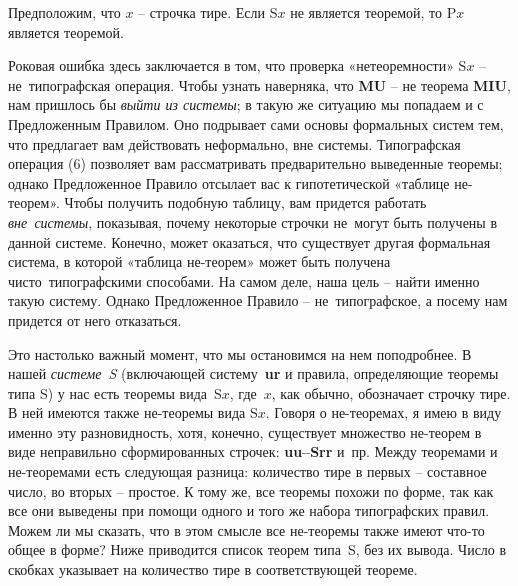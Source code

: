 \documentclass[../main.tex]{subfiles}
\begin{document}
\begin{tcolorbox}[title={ПРЕДЛОЖЕННОЕ ПРАВИЛО}]
    Предположим, что $x$ \--- строчка тире.
    Если S$x$ не является теоремой, то P$x$ является теоремой.
\end{tcolorbox}

Роковая ошибка здесь заключается в том, что проверка «нетеоремности» S$x$ \--- не~типографская операция.
Чтобы узнать наверняка, что \textbf{MU} \--- не теорема \textbf{MIU}, нам пришлось бы \emph{выйти из системы}; в такую же ситуацию мы попадаем и с Предложенным Правилом.
Оно подрывает сами основы формальных систем тем, что предлагает вам действовать неформально, вне системы.
Типографская операция (6) позволяет вам рассматривать предварительно выведенные теоремы; однако Предложенное Правило отсылает вас к гипотетической «таблице не-теорем».
Чтобы получить подобную таблицу, вам придется работать \emph{вне~системы}, показывая, почему некоторые строчки не~могут быть получены в данной системе.
Конечно, может оказаться, что существует другая формальная система, в которой «таблица не-теорем» может быть получена чисто~типографскими способами.
На самом деле, наша цель \--- найти именно такую систему.
Однако Предложенное Правило \--- не~типографское, а посему нам придется от него отказаться.

Это настолько важный момент, что мы остановимся на нем поподробнее.
В нашей \emph{системе~S} (включающей систему~\textbf{ur} и правила, определяющие теоремы типа S) у нас есть теоремы вида~S$x$, где~$x$, как обычно, обозначает строчку тире.
В ней имеются также не-теоремы вида S$x$.
Говоря о не-теоремах, я имею в виду именно эту разновидность, хотя, конечно, существует множество не-теорем в виде неправильно сформированных строчек: \textbf{uu--Srr} и~пр.
Между теоремами и не-теоремами есть следующая разница: количество тире в первых \--- составное число, во вторых \--- простое.
К тому же, все теоремы похожи по форме, так как все они выведены при помощи одного и того же набора типографских правил.
Можем ли мы сказать, что в этом смысле все не-теоремы также имеют что-то общее в форме?
Ниже приводится список теорем типа~S, без их вывода.
Число в скобках указывает на количество тире в соответствующей теореме.
\end{document}
